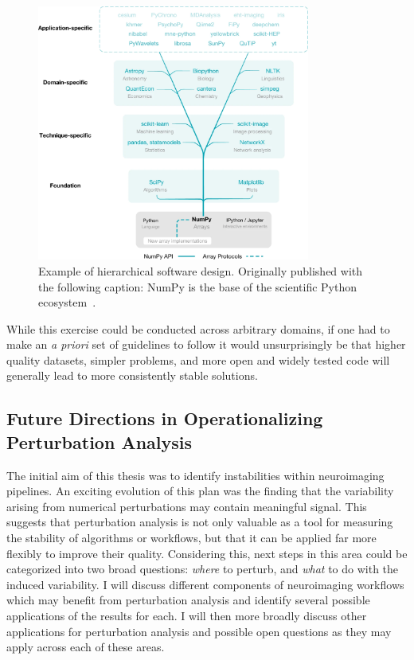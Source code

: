 \begin{figure}[htb!]
\centering
\includegraphics[width=0.8\textwidth]{./figs/numpy.pdf}
\caption[Example of hierarchical software design]{Example of hierarchical software design. Originally published with
the following caption: NumPy is the base of the scientific Python ecosystem~\cite{harris2020array}.}
\label{fig:disc_numpy}
\end{figure}

While this exercise could be conducted across arbitrary domains, if one had to make an \textit{a priori} set of
guidelines to follow it would unsurprisingly be that higher quality datasets, simpler problems, and more open and
widely tested code will generally lead to more consistently stable solutions.


\subsection{Future Directions in Operationalizing Perturbation Analysis}
The initial aim of this thesis was to identify instabilities within neuroimaging pipelines. An exciting evolution
of this plan was the finding that the variability arising from numerical perturbations may contain meaningful signal.
This suggests that perturbation analysis is not only valuable as a tool for measuring the stability of algorithms or
workflows, but that it can be applied far more flexibly to improve their quality. Considering this, next steps in
this area could be categorized into two broad questions: \textit{where} to perturb, and \textit{what} to do with the
induced variability. I will discuss different components of neuroimaging workflows which may benefit from perturbation
analysis and identify several possible applications of the results for each. I will then more broadly discuss other
applications for perturbation analysis and possible open questions as they may apply across each of these areas.


